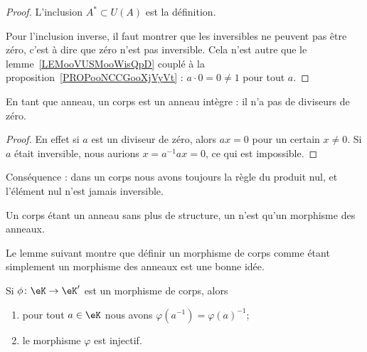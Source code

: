\begin{proof}
    L'inclusion \( A^*\subset U(A)\) est la définition.

    Pour l'inclusion inverse, il faut montrer que les inversibles ne peuvent pas être zéro, c'est à dire que zéro n'est pas inversible. Cela n'est autre que le lemme~\ref{LEMooVUSMooWisQpD} couplé à la proposition~\ref{PROPooNCCGooXjVyVt} : \( a\cdot 0=0\neq 1\) pour tout \( a\).
\end{proof}

\begin{lemma}       \label{LemAnnCorpsnonInterdivzer}
    En tant que anneau, un corps est un anneau intègre : il n'a pas de diviseurs de zéro.
\end{lemma}

\begin{proof}
    En effet si \( a\) est un diviseur de zéro, alors \( ax=0\) pour un certain \( x\neq 0\). Si \( a\) était inversible, nous aurions \( x=a^{-1}ax=0\), ce qui est impossible.
\end{proof}
Conséquence : dans un corps nous avons toujours la règle du produit nul, et l'élément nul n'est jamais inversible.

\begin{definition}
    Un corps étant un anneau sans plus de structure, un  n'est qu'un morphisme des anneaux.
\end{definition}

Le lemme suivant montre que définir un morphisme de corps comme étant simplement un morphisme des anneaux est une bonne idée.
\begin{lemma}       \label{LEMooWBOPooZnsZgQ}
    Si \( \phi\colon \eK\to \eK'\) est un morphisme de corps, alors
    \begin{enumerate}
        \item
            pour tout \( a\in \eK\) nous avons \( \varphi(a^{-1})=\varphi(a)^{-1}\);
        \item
            le morphisme \( \varphi\) est injectif.
    \end{enumerate}
\end{lemma}

